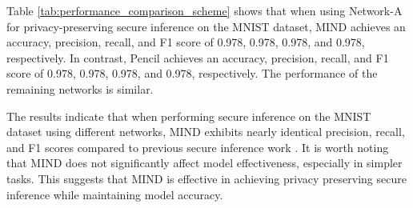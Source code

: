 \documentclass[conference]{IEEEtran}
\begin{document}
Table \ref{tab:performance_comparison_scheme} shows that when using Network-A for privacy-preserving secure inference on the MNIST dataset, MIND achieves an accuracy, precision, recall, and F1 score of 0.978, 0.978, 0.978, and 0.978, respectively.
In contrast, Pencil achieves an accuracy, precision, recall, and F1 score of 0.978, 0.978, 0.978, and 0.978, respectively. The performance of the remaining networks is similar.




The results indicate that when performing secure inference on the MNIST dataset using different networks, MIND exhibits nearly identical precision, recall, and F1 scores compared to previous secure inference work \cite{liu2024pencilprivateextensiblecollaborative}.
It is worth noting that MIND does not significantly affect model effectiveness, especially in simpler tasks. 
This suggests that MIND is effective in achieving privacy preserving secure inference while maintaining model accuracy.
\end{document}
